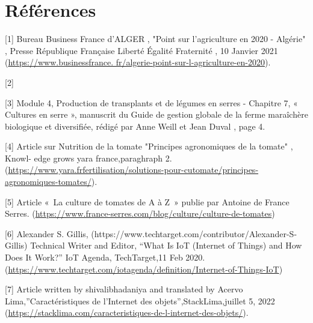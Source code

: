 \chapter*{Références} 
\label{chap:Références} 

[1] Bureau Business France d’ALGER , "Point sur l’agriculture en 2020 - Algérie" , Presse
  République Française Liberté Égalité Fraternité , 10 Janvier 2021 (\url{https://www.businessfrance.
  fr/algerie-point-sur-l-agriculture-en-2020}).\newline
  
  [2]\newline

[3] Module 4, Production de transplants et de légumes en serres - Chapitre 7, « Cultures
  en serre », manuscrit du Guide de gestion globale de la ferme maraîchère biologique et
  diversifiée, rédigé par Anne Weill et Jean Duval , page 4.\newline
  
[4] Article sur Nutrition de la tomate "Principes agronomiques de la tomate" , Knowl-
  edge grows yara france,paraghraph 2.\newline (\url{https://www.yara.frfertilisation/solutions-pour-cutomate/principes-agronomiques-tomates/}).\newline

[5] Article « La culture de tomates de A à Z » publie par Antoine de France Serres. (\url{https://www.france-serres.com/blog/culture/culture-de-tomates})  \newline

[6] Alexander S. Gillis, (https://www.techtarget.com/contributor/Alexander-S-Gillis) Technical Writer and Editor, “What Is IoT (Internet of Things) and How Does It Work?” IoT Agenda, TechTarget,11 Feb 2020. (\url{https://www.techtarget.com/iotagenda/definition/Internet-of-Things-IoT})\newline

[7] Article written by shivalibhadaniya and translated by Acervo Lima,”Caractéristiques de l’Internet des objets”,StackLima,juillet 5, 2022\newline
(\url{https://stacklima.com/caracteristiques-de-l-internet-des-objets/}).